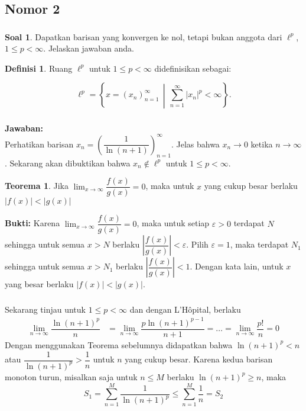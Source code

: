 \documentclass[aspectratio=169]{beamer}
\theoremstyle{definition}
\newtheorem{definisi}{Definisi}
\newtheorem{teorema}{Teorema}
\newtheorem{soal}{Soal}
\begin{document}
\subsection{Nomor 2}
\begin{frame}
  \frametitle{\insertsection}
  \begin{soal}
    Dapatkan barisan yang konvergen ke nol, tetapi bukan anggota dari $\ell^p$, $1 \leq p < \infty$. Jelaskan jawaban anda.
  \end{soal}
  \begin{definisi}
    Ruang \( \ell^p \) untuk \( 1 \leq p < \infty \) didefinisikan sebagai:

    \[
    \ell^p = \left\{ x = (x_n)_{n=1}^\infty \,\middle|\, \sum_{n=1}^\infty |x_n|^p < \infty \right\}.
    \]
  \end{definisi}
\end{frame}


\begin{frame}
  \frametitle{\insertsection}
  \framesubtitle{\insertsubsection}
  \textbf{Jawaban:}\\
  Perhatikan barisan \( x_n = \left( \dfrac{1}{\ln(n+1)} \right)_{n=1}^\infty \). Jelas bahwa \( x_n \to 0 \) ketika \( n \to \infty \). Sekarang akan dibuktikan bahwa \( x_n \notin \ell^p \) untuk \( 1 \leq p < \infty \).
  \begin{teorema}
    Jika $\displaystyle\lim_{x\to \infty}\dfrac{f(x)}{g(x)}=0$, maka untuk $x$ yang cukup besar berlaku $|f(x)| < |g(x)|$ 
  \end{teorema}
  \textbf{Bukti:} Karena $\displaystyle\lim_{x\to \infty}\dfrac{f(x)}{g(x)}=0$, maka untuk setiap $\varepsilon > 0$ terdapat $N$ sehingga untuk semua $x > N$ berlaku $\left| \dfrac{f(x)}{g(x)} \right| < \varepsilon$. Pilih $\varepsilon = 1$, maka terdapat $N_1$ sehingga untuk semua $x > N_1$ berlaku $\left| \dfrac{f(x)}{g(x)} \right| < 1$. Dengan kata lain, untuk $x$ yang besar berlaku $|f(x)| < |g(x)|$.
\end{frame}

\begin{frame}
  \frametitle{\insertsection}
  \framesubtitle{\insertsubsection}
  Sekarang tinjau untuk $1 \leq p < \infty$ dan dengan L'Hôpital, berlaku
  \begin{align*}
    \lim_{n \to \infty} \dfrac{\ln(n+1)^p}{n} &= \lim_{n \to \infty} \dfrac{p\ln(n+1)^{p-1}}{n+1} =\dots= \lim_{n \to \infty} \dfrac{p!}{n} = 0
  \end{align*}
  Dengan menggunakan Teorema sebelumnya didapatkan bahwa $\ln(n+1)^p < n$ atau $\dfrac{1}{\ln(n+1)^p} > \dfrac{1}{n}$ untuk $n$ yang cukup besar. Karena kedua barisan monoton turun, misalkan saja untuk $n\leq M$ berlaku $\ln(n+1)^p \geq n$, maka
  \[S_1=\sum_{n=1}^M \dfrac{1}{\ln(n+1)^p} \leq \sum_{n=1}^M \dfrac{1}{n}=S_2\]
\end{frame}
\end{document}
